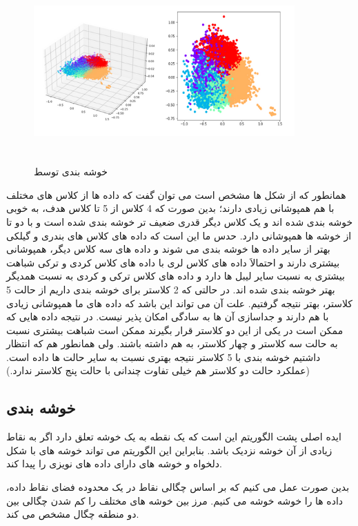 \documentclass[12pt,onecolumn,a4paper]{article}
\begin{document}
\begin{figure}
  \centering
  \includegraphics[width=10cm,height=7cm,keepaspectratio]{18.png}
  \caption{خوشه بندی توسط }
  \label{fig:KMeans}
\end{figure}

همانطور که از شکل ها مشخص است می توان گفت که داده ها از کلاس های مختلف با هم همپوشانی زیادی دارند؛ بدین صورت که 4 کلاس از 5 تا کلاس هدف، به خوبی خوشه بندی شده اند و یک کلاس دیگر قدری ضعیف تر خوشه بندی شده است و با دو تا از خوشه ها همپوشانی دارد. حدس ما این است که داده های کلاس های بندری و گیلکی بهتر از سایر داده ها خوشه بندی می شوند و داده های سه کلاس دیگر، همپوشانی بیشتری دارند و احتمالاَ داده های کلاس لری با داده های کلاس کردی و ترکی شباهت بیشتری به نسبت سایر لیبل ها دارد و داده های کلاس ترکی و کردی به نسبت همدیگر بهتر خوشه بندی شده اند. در حالتی که 2 کلاستر برای خوشه بندی داریم از حالت 5 کلاستر، بهتر نتیجه گرفتیم. علت آن می تواند این باشد که داده های ما همپوشانی زیادی با هم دارند و جداسازی آن ها به سادگی امکان پذیر نیست. در نتیجه داده هایی که ممکن است در یکی از این دو کلاستر قرار بگیرند ممکن است شباهت بیشتری نسبت به حالت سه کلاستر و چهار کلاستر، به هم داشته باشند. ولی همانطور هم که انتظار داشتیم خوشه بندی با 5 کلاستر نتیجه بهتری نسبت به سایر حالت ها داده است. (عملکرد حالت دو کلاستر هم خیلی تفاوت چندانی با حالت پنج کلاستر ندارد.)

\subsection{خوشه بندی }
ایده اصلی پشت الگوریتم  این است که یک نقطه به یک خوشه تعلق دارد اگر به نقاط زیادی از آن خوشه نزدیک باشد. بنابراین این الگوریتم می تواند خوشه های با شکل دلخواه و خوشه های دارای داده های نویزی را پیدا کند. 

بدین صورت عمل می کنیم که بر اساس چگالی نقاط در یک محدوده فضای نقاط داده، داده ها را خوشه خوشه می کنیم. مرز بین خوشه های مختلف را کم شدن چگالی بین دو منطقه چگال مشخص می کند.
\end{document}
